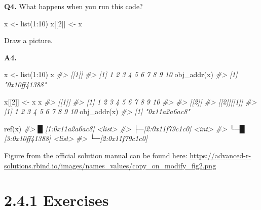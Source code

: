 \documentclass[
]{book}
\newenvironment{Shaded}{\begin{snugshade}}{\end{snugshade}}
\newcommand{\CommentTok}[1]{\textcolor[rgb]{0.56,0.35,0.01}{\textit{#1}}}
\newcommand{\DecValTok}[1]{\textcolor[rgb]{0.00,0.00,0.81}{#1}}
\newcommand{\FunctionTok}[1]{\textcolor[rgb]{0.00,0.00,0.00}{#1}}
\newcommand{\NormalTok}[1]{#1}
\newcommand{\OtherTok}[1]{\textcolor[rgb]{0.56,0.35,0.01}{#1}}
\newcommand{\SpecialCharTok}[1]{\textcolor[rgb]{0.00,0.00,0.00}{#1}}
\begin{document}
\textbf{Q4.} What happens when you run this code?

\begin{Shaded}
\begin{Highlighting}[]
\NormalTok{x }\OtherTok{\textless{}{-}} \FunctionTok{list}\NormalTok{(}\DecValTok{1}\SpecialCharTok{:}\DecValTok{10}\NormalTok{)}
\NormalTok{x[[}\DecValTok{2}\NormalTok{]] }\OtherTok{\textless{}{-}}\NormalTok{ x}
\end{Highlighting}
\end{Shaded}

Draw a picture.

\textbf{A4.}

\begin{Shaded}
\begin{Highlighting}[]
\NormalTok{x }\OtherTok{\textless{}{-}} \FunctionTok{list}\NormalTok{(}\DecValTok{1}\SpecialCharTok{:}\DecValTok{10}\NormalTok{)}
\NormalTok{x}
\CommentTok{\#\textgreater{} [[1]]}
\CommentTok{\#\textgreater{}  [1]  1  2  3  4  5  6  7  8  9 10}
\FunctionTok{obj\_addr}\NormalTok{(x)}
\CommentTok{\#\textgreater{} [1] "0x10ff41388"}

\NormalTok{x[[}\DecValTok{2}\NormalTok{]] }\OtherTok{\textless{}{-}}\NormalTok{ x}
\NormalTok{x}
\CommentTok{\#\textgreater{} [[1]]}
\CommentTok{\#\textgreater{}  [1]  1  2  3  4  5  6  7  8  9 10}
\CommentTok{\#\textgreater{} }
\CommentTok{\#\textgreater{} [[2]]}
\CommentTok{\#\textgreater{} [[2]][[1]]}
\CommentTok{\#\textgreater{}  [1]  1  2  3  4  5  6  7  8  9 10}
\FunctionTok{obj\_addr}\NormalTok{(x)}
\CommentTok{\#\textgreater{} [1] "0x11a2a6ac8"}

\FunctionTok{ref}\NormalTok{(x)}
\CommentTok{\#\textgreater{} █ [1:0x11a2a6ac8] \textless{}list\textgreater{} }
\CommentTok{\#\textgreater{} ├─[2:0x11f79c1c0] \textless{}int\textgreater{} }
\CommentTok{\#\textgreater{} └─█ [3:0x10ff41388] \textless{}list\textgreater{} }
\CommentTok{\#\textgreater{}   └─[2:0x11f79c1c0]}
\end{Highlighting}
\end{Shaded}

Figure from the official solution manual can be found here:
\url{https://advanced-r-solutions.rbind.io/images/names_values/copy_on_modify_fig2.png}

\hypertarget{exercises-2}{%
\section{2.4.1 Exercises}\label{exercises-2}}
\end{document}
